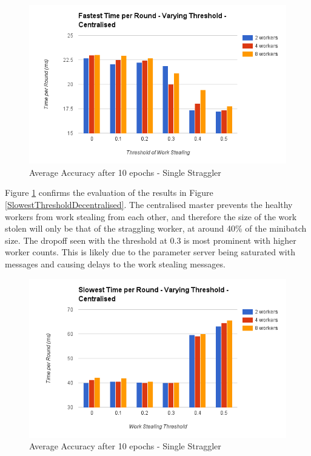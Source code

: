 \documentclass[12pt]{article}
\begin{document}
\begin{figure}[H]
  \centering
  \includegraphics[width=6in]{FastestThresholdCentralised}
  \caption[]{Average Accuracy after 10 epochs - Single Straggler}
  \label{FastestThresholdCentralised}
\end{figure}

Figure \ref{FastestThresholdCentralised} confirms the evaluation of the results in Figure  \ref{SlowestThresholdDecentralised}. The centralised master prevents the healthy workers from work stealing from each other, and therefore the size of the work stolen will only be that of the straggling worker, at around 40\% of the minibatch size. The dropoff seen with the threshold at 0.3 is most prominent with higher worker counts. This is likely due to the parameter server being saturated with messages and causing delays to the work stealing messages.

\begin{figure}[H]
  \centering
  \includegraphics[width=6in]{SlowestThresholdCentralised}
  \caption[]{Average Accuracy after 10 epochs - Single Straggler}
  \label{SlowestThresholdCentralised}
\end{figure}
\end{document}
